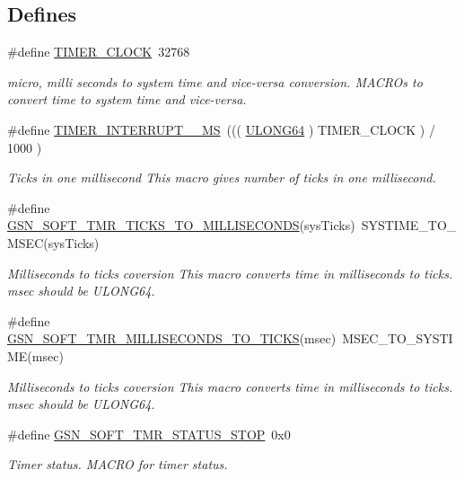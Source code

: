 \subsection*{Defines}
\begin{DoxyCompactItemize}
\item 
\#define \hyperlink{a00673_ga05ec5d63e2ba7621d706137124efca7d}{TIMER\_\-CLOCK}~32768
\begin{DoxyCompactList}\small\item\em micro, milli seconds to system time and vice-\/versa conversion. MACROs to convert time to system time and vice-\/versa. \end{DoxyCompactList}\item 
\#define \hyperlink{a00673_gad5a672b2263743c1daf0ee6797d2fbfd}{TIMER\_\-INTERRUPT\_\_\-MS}~((( \hyperlink{a00660_ga28961430434ccabca6862ea93fe9a15b}{ULONG64} ) TIMER\_\-CLOCK ) / 1000 )
\begin{DoxyCompactList}\small\item\em Ticks in one millisecond This macro gives number of ticks in one millisecond. \end{DoxyCompactList}\item 
\#define \hyperlink{a00673_gaf705ea28da184c29e230284fead5a65c}{GSN\_\-SOFT\_\-TMR\_\-TICKS\_\-TO\_\-MILLISECONDS}(sysTicks)~SYSTIME\_\-TO\_\-MSEC(sysTicks)
\begin{DoxyCompactList}\small\item\em Milliseconds to ticks coversion This macro converts time in milliseconds to ticks. msec should be ULONG64. \end{DoxyCompactList}\item 
\#define \hyperlink{a00673_gadf848291010b1f5e5b666443103cdb89}{GSN\_\-SOFT\_\-TMR\_\-MILLISECONDS\_\-TO\_\-TICKS}(msec)~MSEC\_\-TO\_\-SYSTIME(msec)
\begin{DoxyCompactList}\small\item\em Milliseconds to ticks coversion This macro converts time in milliseconds to ticks. msec should be ULONG64. \end{DoxyCompactList}\item 
\#define \hyperlink{a00673_ga55580feca337034720758e6ca520adb3}{GSN\_\-SOFT\_\-TMR\_\-STATUS\_\-STOP}~0x0
\begin{DoxyCompactList}\small\item\em Timer status. MACRO for timer status. \end{DoxyCompactList}\end{DoxyCompactItemize}
